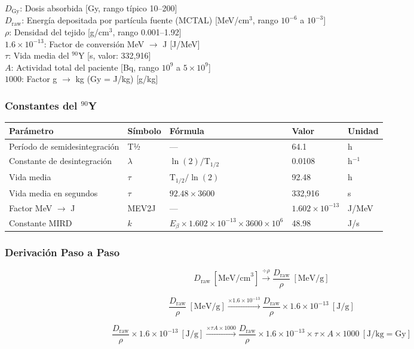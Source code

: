 \documentclass[12pt,a4paper]{article}
\newcommand{\vardef}[2]{\noindent\textbf{#1}: #2\\}
\begin{document}
\vardef{$D_{\text{Gy}}$}{Dosis absorbida [Gy, rango típico 10--200]}
\vardef{$D_{\text{raw}}$}{Energía depositada por partícula fuente (MCTAL) [MeV/cm$^3$, rango $10^{-6}$ a $10^{-3}$]}
\vardef{$\rho$}{Densidad del tejido [g/cm$^3$, rango 0.001--1.92]}
\vardef{$1.6\times10^{-13}$}{Factor de conversión MeV $\to$ J [J/MeV]}
\vardef{$\tau$}{Vida media del $^{90}$Y [s, valor: 332,916]}
\vardef{$A$}{Actividad total del paciente [Bq, rango $10^9$ a $5\times10^9$]}
\vardef{$1000$}{Factor g $\to$ kg (Gy = J/kg) [g/kg]}

\subsubsection{Constantes del $^{90}$Y}

\begin{tabular}{p{4cm} p{2cm} p{4cm} p{2.5cm} p{2cm}}
\toprule
\textbf{Parámetro} & \textbf{Símbolo} & \textbf{Fórmula} & \textbf{Valor} & \textbf{Unidad} \\
\midrule
Período de semidesintegración & T½ & --- & 64.1 & h \\
Constante de desintegración & $\lambda$ & $\ln(2)/\text{T}_{1/2}$ & 0.0108 & h$^{-1}$ \\
Vida media & $\tau$ & $\text{T}_{1/2}/\ln(2)$ & 92.48 & h \\
Vida media en segundos & $\tau$ & $92.48 \times 3600$ & 332,916 & s \\
Factor MeV $\to$ J & MEV2J & --- & $1.602\times10^{-13}$ & J/MeV \\
Constante MIRD & $k$ & $E_{\beta} \times 1.602\times10^{-13} \times 3600 \times 10^6$ & 48.98 & J/s \\
\bottomrule
\end{tabular}

\subsubsection{Derivación Paso a Paso}

$$D_{\text{raw}}\ [\text{MeV/cm}^3] \xrightarrow{\div \rho} \frac{D_{\text{raw}}}{\rho}\ [\text{MeV/g}]$$

$$\frac{D_{\text{raw}}}{\rho}\ [\text{MeV/g}] \xrightarrow{\times 1.6\times10^{-13}} \frac{D_{\text{raw}}}{\rho} \times 1.6\times10^{-13}\ [\text{J/g}]$$

$$\frac{D_{\text{raw}}}{\rho} \times 1.6\times10^{-13}\ [\text{J/g}] \xrightarrow{\times \tau A \times 1000} \frac{D_{\text{raw}}}{\rho} \times 1.6\times10^{-13} \times \tau \times A \times 1000\ [\text{J/kg} = \text{Gy}]$$
\end{document}
